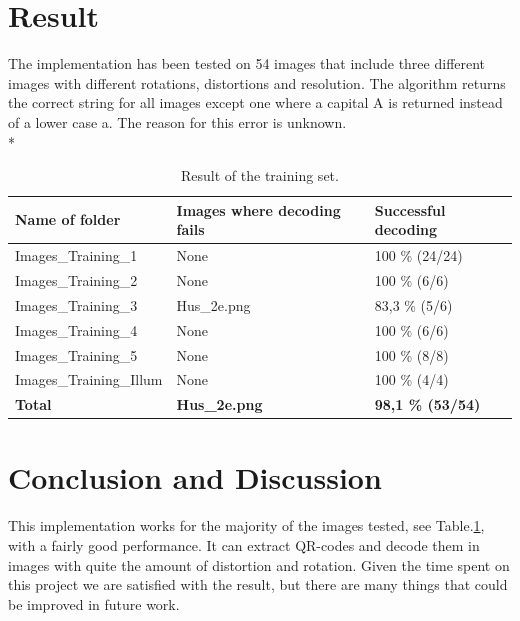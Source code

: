 \documentclass[12pt,a4paper]{article}
\begin{document}
\section{Result}
The implementation has been tested on 54 images that include three different images with different rotations, distortions and resolution. The algorithm returns the correct string for all images except one where a capital A is returned instead of a lower case a. The reason for this error is unknown. \\*
\begin{table}
    \begin{tabular}{|l|l|l|}
    \hline
    \textbf{Name of folder}          & \textbf{Images where decoding fails} & \textbf{Successful decoding} \\ \hline
    Images\_Training\_1     & None                        & 100 \% (24/24)      \\ \hline
    Images\_Training\_2     & None                        & 100 \% (6/6)        \\ \hline
    Images\_Training\_3     & Hus\_2e.png                 & 83,3 \% (5/6)       \\ \hline
    Images\_Training\_4     & None                        & 100 \% (6/6)        \\ \hline
    Images\_Training\_5     & None                        & 100 \% (8/8)        \\ \hline
    Images\_Training\_Illum & None                        & 100 \% (4/4)        \\ \hline
    \textbf{Total}                   & \textbf{Hus\_2e.png }                & \textbf{98,1 \% (53/54)}     \\ \hline
    \end{tabular}
    \caption{\label{tab:result}Result of the training set.}
\end{table}

\section{Conclusion and Discussion}
This implementation works for the majority of the images tested, see Table.\ref{tab:result}, with a fairly good performance. 
It can extract QR-codes and decode them in images with quite the amount of distortion and rotation. Given the time spent on this project we are satisfied with the result, but there are many things that could be improved in future work.
\end{document}
